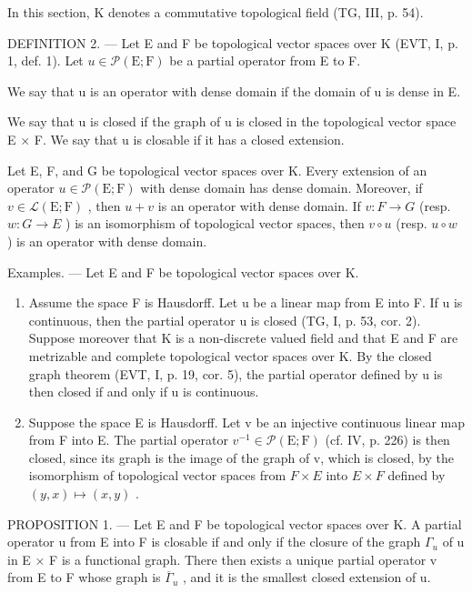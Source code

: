 In this section, K denotes a commutative topological field (TG, III, p. 54).

DEFINITION 2. --- Let E and F be topological vector spaces over K (EVT, I, p. 1, def. 1). Let \(u \in \mathcal{P}(\mathrm{E};\mathrm{F})\) be a partial operator from E to F.

We say that u is an operator with dense domain if the domain of u is dense in E.

We say that u is closed if the graph of u is closed in the topological vector space E × F. We say that u is closable if it has a closed extension.

Let E, F, and G be topological vector spaces over K. Every extension of an operator \(u \in \mathcal{P}(\mathrm{E};\mathrm{F})\) with dense domain has dense domain. Moreover, if \(v \in \mathcal{L}(\mathrm{E};\mathrm{F})\) , then \(u + v\) is an operator with dense domain. If \(v: F \to G\) (resp. \(w: G \to E\) ) is an isomorphism of topological vector spaces, then \(v \circ u\) (resp. \(u \circ w\) ) is an operator with dense domain.

Examples. --- Let E and F be topological vector spaces over K.

\begin{enumerate}
\def\labelenumi{\arabic{enumi})}
\item
  Assume the space F is Hausdorff. Let u be a linear map from E into F. If u is continuous, then the partial operator u is closed (TG, I, p. 53, cor. 2). Suppose moreover that K is a non-discrete valued field and that E and F are metrizable and complete topological vector spaces over K. By the closed graph theorem (EVT, I, p. 19, cor. 5), the partial operator defined by u is then closed if and only if u is continuous.
\item
  Suppose the space E is Hausdorff. Let v be an injective continuous linear map from F into E. The partial operator \(v^{-1} \in \mathcal{P}(\mathrm{E};\mathrm{F})\) (cf. IV, p. 226) is then closed, since its graph is the image of the graph of v, which is closed, by the isomorphism of topological vector spaces from \(F \times E\) into \(E \times F\) defined by \((y,x) \mapsto (x,y)\) .
\end{enumerate}

PROPOSITION 1. --- Let E and F be topological vector spaces over K. A partial operator u from E into F is closable if and only if the closure of the graph \(\Gamma_{u}\) of u in E × F is a functional graph. There then exists a unique partial operator v from E to F whose graph is \(\overline{\Gamma}_{u}\) , and it is the smallest closed extension of u.

